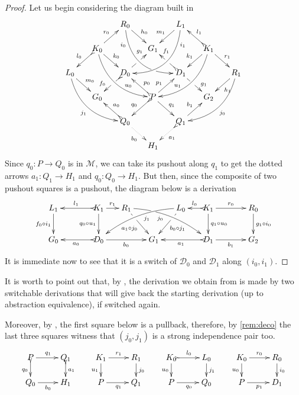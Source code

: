 \documentclass[a4paper,UKenglish,cleveref,pdftex,thm-restate,numberwithinsect]{lipics-v2021}
\def\G{\textbf {\textup{G}}}
\newcommand{\dder}[1]{\mathscr{#1}}
\begin{document}
\prChurch*
\label{prChurch-proof}

\begin{proof}

  Let us begin considering the diagram
  built in 
  \[\xymatrix@C=15pt@R=15pt{&&R_0
      \ar@/_.8cm/[ddrr]_(.2){i_0}|(.7)\hole \ar[dr]^{h_0}&&
      L_1\ar@/^.8cm/[ddll]^(.2){i_1}
      \ar[dl]_{m_1}\\&K_0\ar[dr]^{k_0}\ar@{>->}[dl]_{l_0}
      \ar@/_.6cm/[ddrr]^(.65){u_0}\ar[ur]^{r_0}&& G_1 && K_1
      \ar@/^.6cm/[ddll]_(.65){u_1}\ar[dl]_{k_1}\ar@{>->}[lu]_{l_1}
      \ar[dr]^{r_1}\\L_0 \ar[dr]^{m_0} \ar@{>}@/_.6cm/[ddrr]_{j_1}&& D_0
      \ar@{>->}[dl]|(.42)\hole_(.64){f_0}\ar[ur]|(.48)\hole^(.7){g_1}&&D_1
      \ar[dr]|(.42)\hole^(.65){g_1}
      \ar@{>->}[ul]|(.48)\hole_(.7){f_1}&&R_1\ar@/^.6cm/[ddll]^{j_0}\ar[dl]^{h_1}\\&G_0
      &&P\ar[dr]^{q_1}
      \ar@{>->}[dl]_{q_0}\ar[ur]^(.4){p_1}\ar@{>->}[ul]_(.4){p_0}&&G_2\\&&Q_0
      \ar@{>->}@{>->}[ul]_{a_0} \ar@{.>}[dr]_{b_0} &&Q_1\ar[ur]^{b_1}
      \ar@{>.>}[dl]^{a_1} \\ &&&H_1 }\] Since $q_0\colon P\to Q_0$ is in
  $\mathcal{M}$, we can take its pushout along $q_1$ to get the dotted
  arrows $a_1\colon Q_1\to H_1$ and $q_0\colon Q_0\to H_1$. But then,
  since the composite of two pushout squares is a pushout, the diagram
  below is a derivation
  \[\xymatrix@C=15pt{L_1 \ar[d]_{f_0 \circ i_1}&& K_1
      \ar[d]_{q_0\circ u_1}\ar@{>->}[ll]_{l_1} \ar[r]^{r_1} & R_1
      \ar@/^.35cm/[drrr]|(.3)\hole_(.4){j_0} \ar[dr]|(.3)\hole_{a_1\circ
        j_0} && L_0 \ar@/_.35cm/[dlll]^(.4){j_1} \ar[dl]|(.3)\hole^{b_0\circ
        j_1}& K_1 \ar[d]^{q_1\circ u_0}\ar@{>->}[l]_{l_0} \ar[rr]^{r_0} && R_0
      \ar[d]^{g_1\circ i_0} \\G_0 && \ar@{>->}[ll]^{a_0} D_0 \ar[rr]_{b_0}&&
      G_1 && \ar@{>->}[ll]^{a_1} D_1 \ar[rr]_{b_1}&& G_2}\] It is immediate
  now to see that it is a switch of $\dder{D}_0$ and $\dder{D}_1$ along
  $(i_0, i_1)$.
\end{proof}

\begin{remark}
	\label{rem:church}
	It is worth to point out that, by
	, the derivation we obtain from
	is made by two switchable derivations that will
	give back the starting derivation (up to abstraction equivalence),
	if switched again.
	
	Moreover, by , the first square below is a
	pullback, therefore, by \cref{rem:deco} the last three squares
	witness that $(j_0, j_1)$ is a strong independence pair too.
	\[
	\xymatrix@R=15pt{P\ar[r]^{q_1} \ar@{>->}[d]_{q_0}&Q_1
		\ar@{>->}[d]^{a_1}&K_1 \ar[r]^{r_1} \ar[d]_{u_1}& R_1
		\ar[d]^{j_0} & K_0 \ar@{>->}[r]^{l_0} \ar[d]_{u_0}& L_0
		\ar[d]^{j_1}&K_0 \ar[r]^{r_0} \ar[d]_{u_0}& R_0\ar[d]^{i_0} \\
		Q_ 0\ar[r]_{b_0}&H_1&P \ar[r]_{q_1} & Q_1 &P \ar[r]_{q_0} &
		Q_0&P \ar[r]_{p_1} & D_1}
	\]
\end{remark}
\end{document}
